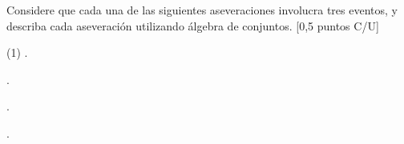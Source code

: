 \documentclass[]{srs}
\begin{document}
Considere que cada una de las siguientes aseveraciones involucra tres eventos, y
describa cada aseveración utilizando álgebra de conjuntos. [0,5 puntos C/U]
\begin{preguntas}(1)
\pregunta {}.
\begin{respuesta}[height=2cm]
\end{respuesta}
\pregunta {}.
\begin{respuesta}[height=2cm]
\end{respuesta}
\pregunta {}.
\begin{respuesta}[height=2cm]
\end{respuesta}
\pregunta {}.
\begin{respuesta}[height=2cm]
\end{respuesta}

\end{preguntas}
\end{document}
